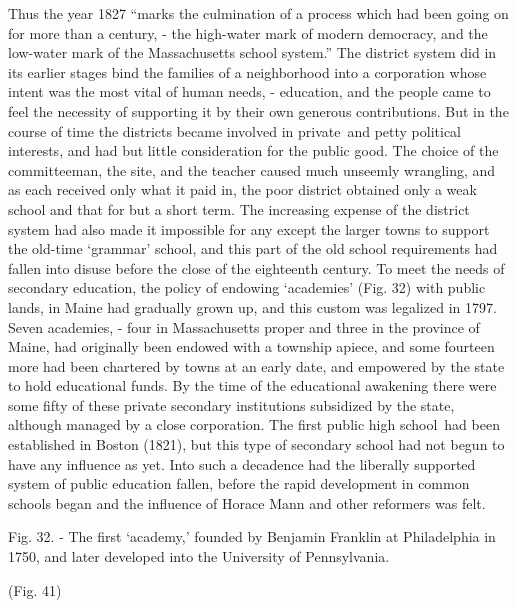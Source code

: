 \documentclass[
]{book}
\begin{document}
Thus the year 1827 ``marks the culmination of a process which had been going on for more than a century, - the high-water mark of modern democracy, and the low-water mark of the Massachusetts school system.'' The district system did in its earlier stages bind the families of a neighborhood into a corporation whose intent was the most vital of human needs, - education, and the people came to feel the necessity of supporting it by their own generous contributions. But in the course of time the districts became involved in private~and petty political interests, and had but little consideration for the public good. The choice of the committeeman, the site, and the teacher caused much unseemly wrangling, and as each received only what it paid in, the poor district obtained only a weak school and that for but a short term. The increasing expense of the district system had also made it impossible for any except the larger towns to support the old-time `grammar' school, and this part of the old school requirements had fallen into disuse before the close of the eighteenth century. To meet the needs of secondary education, the policy of endowing `academies' (Fig. 32) with public lands, in Maine had gradually grown up, and this custom was legalized in 1797. Seven academies, - four in Massachusetts proper and three in the province of Maine, had originally been endowed with a township apiece, and some fourteen more had been chartered by towns at an early date, and empowered by the state to hold educational funds. By the time of the educational awakening there were some fifty of these private secondary institutions subsidized by the state, although managed by a close corporation. The first public high school~had been established in Boston (1821), but this type of secondary school had not begun to have any influence as yet. Into such a decadence had the liberally supported system of public education fallen, before the rapid development in common schools began and the influence of Horace Mann and other reformers was felt.

Fig. 32. - The first `academy,' founded by Benjamin Franklin at Philadelphia in 1750, and later developed into the University of Pennsylvania.

(Fig. 41)
\end{document}
